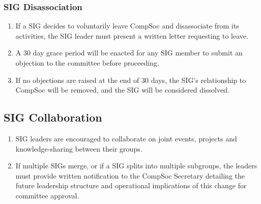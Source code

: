 \subsubsection{SIG Disassociation}
\begin{enumerate}
    \item If a SIG decides to voluntarily leave CompSoc and disassociate from its activities, the SIG leader must present a written letter requesting to leave.
    \item A 30 day grace period will be enacted for any SIG member to submit an objection to the committee before proceeding.
    \item If no objections are raised at the end of 30 days, the SIG's relationship to CompSoc will be removed, and the SIG will be considered dissolved.
\end{enumerate}

\subsection{SIG Collaboration}
\begin{enumerate}
    \item SIG leaders are encouraged to collaborate on joint events, projects and knowledge-sharing between their groups.
    \item If multiple SIGs merge, or if a SIG splits into multiple subgroups, the leaders must provide written notification to the CompSoc Secretary detailing the future leadership structure and operational implications of this change for committee approval.
\end{enumerate}
